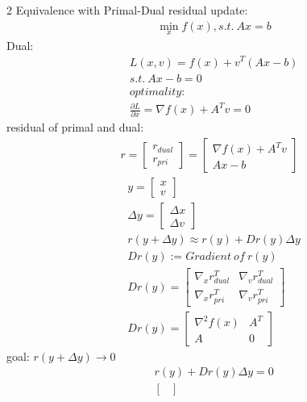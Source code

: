 \documentclass[8pt]{extarticle}
\begin{document}
\begin{multicols*}{2}
  Equivalence with Primal-Dual residual update:
  \begin{align*}
    &\min_x f(x), s.t.\ Ax=b
  \end{align*}
  Dual:
  \begin{align*}
    &L(x,v) = f(x) + v^T(Ax-b)\\
    &s.t.\ Ax-b=0\\
    &optimality:\\
    &\frac{\partial L}{\partial x} = \nabla f(x) + A^Tv = 0
  \end{align*}
  residual of primal and dual:
  \begin{align*}
    r=\begin{bmatrix}
      r_{dual}\\
      r_{pri}
    \end{bmatrix}
    =\begin{bmatrix}
      \nabla f(x) + A^Tv\\
      Ax-b
    \end{bmatrix}
  \end{align*}
  \begin{align*}
    &y =
    \begin{bmatrix}
      x\\ v
    \end{bmatrix}\\
    &\Delta y =
    \begin{bmatrix}
      \Delta x\\ \Delta v
    \end{bmatrix}\\
    &r(y+\Delta y) \approx r(y) + Dr(y) \Delta y\\
    &Dr(y):=Gradient\ of\ r(y)\\
    &Dr(y) =
      \begin{bmatrix}
        \nabla_x r_{dual}^T & \nabla_v r_{dual}^T\\
        \nabla_x r_{pri}^T & \nabla_v r_{pri}^T
      \end{bmatrix}\\
    &Dr(y) =
      \begin{bmatrix}
        \nabla^2 f(x) & A^T\\
        A & 0
      \end{bmatrix}                             
  \end{align*}
  goal: $r(y+\Delta y) \to 0$
  \vfill\null
  \pagebreak
  \begin{align*}
    &r(y) + Dr(y) \Delta y = 0\\
    &\begin{bmatrix}

\end{bmatrix}
\end{align*}
\end{multicols*}
\end{document}
